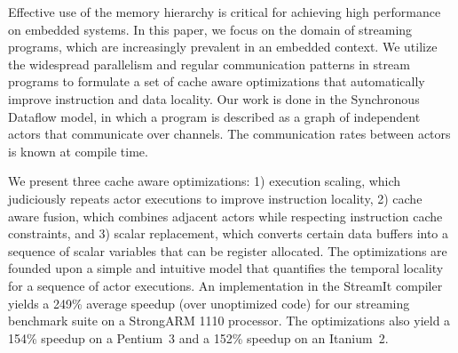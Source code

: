 Effective use of the memory hierarchy is critical for achieving high
performance on embedded systems.  In this paper, we focus on the
domain of streaming programs, which are increasingly prevalent in an
embedded context.  We utilize the widespread parallelism and regular
communication patterns in stream programs to formulate a set of cache
aware optimizations that automatically improve instruction and data
locality.  Our work is done in the Synchronous Dataflow model, in
which a program is described as a graph of independent actors that
communicate over channels.  The communication rates between actors is
known at compile time.

We present three cache aware optimizations: 1) execution scaling,
which judiciously repeats actor executions to improve instruction
locality, 2) cache aware fusion, which combines adjacent actors while
respecting instruction cache constraints, and 3) scalar replacement,
which converts certain data buffers into a sequence of scalar
variables that can be register allocated.  The optimizations are
founded upon a simple and intuitive model that quantifies the temporal
locality for a sequence of actor executions.  An implementation in the
StreamIt compiler yields a 249\% average speedup (over unoptimized
code) for our streaming benchmark suite on a StrongARM 1110 processor.
The optimizations also yield a 154\% speedup on a Pentium~3 and a
152\% speedup on an Itanium~2.
